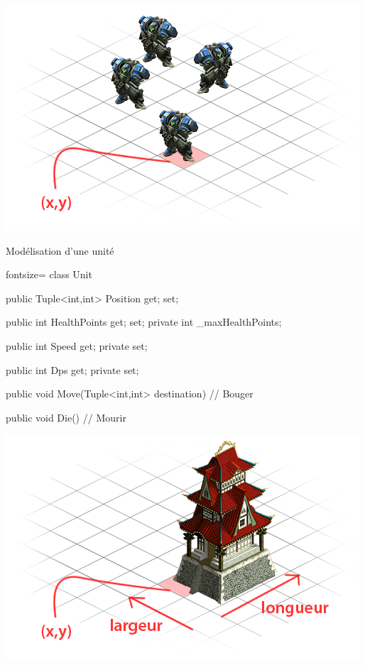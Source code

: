 \begin{frame}
  \begin{center}
      \vspace{1.1cm}\includegraphics[scale=0.4]{img/unit.png}
  \end{center}
\end{frame}
\endgroup

\begin{frame}[fragile]
\begin{center}{\large Modélisation d'une unité}\end{center}
  \begin{csharpcode*}{fontsize=\scriptsize}
class Unit
{
    public Tuple<int,int> Position { get; set; }

    public int HealthPoints { get; set; }
    private int _maxHealthPoints;

    public int Speed { get; private set; }

    public int Dps { get; private set; }

    public void Move(Tuple<int,int> destination)
    {
        // Bouger
    }

    public void Die()
    {
        // Mourir
    }
}
  \end{csharpcode*}
\end{frame}

\begingroup
{}
\begin{frame}
  \begin{center}
    \vspace{1.4cm}\includegraphics[scale=0.4]{img/building.png}
  \end{center}
\end{frame}
\endgroup


